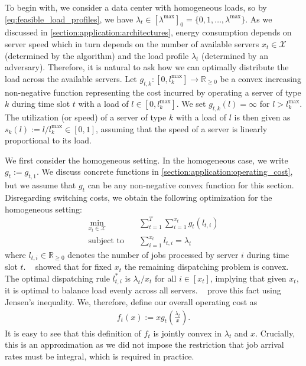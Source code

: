 To begin with, we consider a data center with homogeneous loads, so by \cref{eq:feasible_load_profiles}, we have $\lambda_t \in [\lambda^{\text{max}}]_0 = \{0, 1, \dots, \lambda^{\text{max}}\}$. As we discussed in \cref{section:application:architectures}, energy consumption depends on server speed which in turn depends on the number of available servers $x_t \in \mathcal{X}$ (determined by the algorithm) and the load profile $\lambda_t$ (determined by an adversary). Therefore, it is natural to ask how we can optimally distribute the load across the available servers. Let $g_{t,k} : [0,l_k^{\text{max}}] \to \mathbb{R}_{\geq 0}$ be a convex increasing non-negative function representing the cost incurred by operating a server of type $k$ during time slot $t$ with a load of $l \in [0,l_k^{\text{max}}]$. We set $g_{t,k}(l) = \infty$ for $l > l_k^{\text{max}}$. The utilization (or speed) of a server of type $k$ with a load of $l$ is then given as $s_k(l) := l / l_k^{\text{max}} \in [0,1]$, assuming that the speed of a server is linearly proportional to its load.

We first consider the homogeneous setting. In the homogeneous case, we write $g_t := g_{t,1}$. We discuss concrete functions in \cref{section:application:operating_cost}, but we assume that $g_t$ can be any non-negative convex function for this section. Disregarding switching costs, we obtain the following optimization for the homogeneous setting: \begin{align*}
    \min_{x_t \in \mathcal{X}} \quad &\sum_{t=1}^T \sum_{i=1}^{x_t} g_t(l_{t,i}) \\
    \text{subject to}        \quad &\sum_{i=1}^{x_t} l_{t,i} = \lambda_t
\end{align*} where $l_{t,i} \in \mathbb{R}_{\geq 0}$ denotes the number of jobs processed by server $i$ during time slot $t$. \citeauthor*{Lin2011}~\cite{Lin2011} showed that for fixed $x_t$ the remaining dispatching problem is convex. The optimal dispatching rule $l_{t,i}^*$ is $\lambda_t / x_t$ for all $i \in [x_t]$, implying that given $x_t$, it is optimal to balance load evenly across all servers. \citeauthor*{Albers2021_2}~\cite{Albers2021_2} prove this fact using Jensen's inequality. We, therefore, define our overall operating cost as \begin{align}\label{eq:homogeneous_load_balancing}
    f_t(x) := x g_t\left(\frac{\lambda_t}{x}\right).
\end{align} It is easy to see that this definition of $f_t$ is jointly convex in $\lambda_t$ and $x$. Crucially, this is an approximation as we did not impose the restriction that job arrival rates must be integral, which is required in practice.

